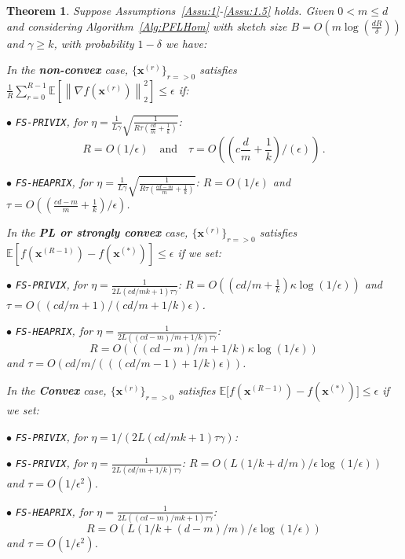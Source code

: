 \documentclass[sigconf, anonymous, review]{acmart}
\newtheorem{theorem}{Theorem}
\begin{document}
\begin{theorem}\label{thm:homog_case}
Suppose Assumptions~\ref{Assu:1}-\ref{Assu:1.5} holds. 
Given $0<m\leq d$ and considering Algorithm~\ref{Alg:PFLHom} with sketch size $B=O\left(m\log\left(\frac{d R}{\delta}\right)\right)$ and $\gamma\geq k$, with probability $1-\delta$ we have: 

In the \textbf{non-convex} case, $\{ {\boldsymbol{x}}^{(r)}\}_{r=>0}$ satisfies  $\frac{1}{R}\sum_{r=0}^{R-1}\mathbb{E}\left[\left\|\nabla f({\boldsymbol{x}}^{(r)})\right\|_2^2\right]\leq {\epsilon}$ if: 
 
\noindent $\bullet$ \texttt{FS-PRIVIX}, for $\eta=\frac{1}{L\gamma}\sqrt{\frac{1}{R\tau\left(\frac{c d}{m }+\frac{1}{k}\right)}}$: 
$$R=O\left(1/\epsilon\right) \quad \textrm{and} \quad  \tau=O\left(( c\frac{d}{m}+\frac{1}{k})/(\epsilon)\right) \, .$$

\noindent $\bullet$ \texttt{FS-HEAPRIX}, for $\eta=\frac{1}{L\gamma}\sqrt{\frac{1}{R\tau\left(\frac{cd-m}{m}+\frac{1}{k}\right)}}$: $R=O\left(1/\epsilon\right)$ and $\tau=O\left(( \frac{c d-m}{m}+\frac{1}{k})/\epsilon\right)$.

In the \textbf{PL or strongly convex} case, $\{ {\boldsymbol{x}}^{(r)}\}_{r=>0}$ satisfies $\mathbb{E}[f({\boldsymbol{x}}^{(R-1)})-f({\boldsymbol{x}}^{(*)})]\leq \epsilon$ if  we set:  

\noindent $\bullet$ \texttt{FS-PRIVIX}, for $\eta=\frac{1}{2L(cd/mk+1)\tau\gamma}$: $R=O\left(\left(c d/m+\frac{1}{k}\right)\kappa\log\left(1/\epsilon\right)\right)$ and $\tau=O\left((c d/m+1)\Big/\left(c d/m+1/k\right)\epsilon\right)$.

\noindent $\bullet$ \texttt{FS-HEAPRIX}, for $\eta=\frac{1}{2L\left((cd-m)/m+1/k\right)\tau\gamma}$: 
$$R = O\left(\left((cd-m)/m+1/k\right)\kappa\log\left(1/\epsilon\right)\right)$$ and $ \tau =O\left(cd/m\Big/\left(\left((cd/m-1)+1/k\right)\epsilon\right)\right)$.


In the \textbf{Convex} case, $\{ {\boldsymbol{x}}^{(r)}\}_{r=>0}$ satisfies $ \mathbb{E}\Big[f({\boldsymbol{x}}^{(R-1)})-f({\boldsymbol{x}}^{(*)})\Big]\leq \epsilon$ if we set:  

\noindent $\bullet$ \texttt{FS-PRIVIX}, for $\eta=1/(2L(cd/mk+1)\tau\gamma)$: 

\noindent $\bullet$ \texttt{FS-PRIVIX}, for $\eta=\frac{1}{2L(cd/m+1/k)\tau\gamma}$: $R =O\left(L\left(1/k+d/m\right)/\epsilon\log\left(1/\epsilon \right)\right)$ and $\tau=O\left(1/\epsilon^2\right)$.

\noindent $\bullet$ \texttt{FS-HEAPRIX}, for $\eta=\frac{1}{2L\left((cd-m)/mk+1\right)\tau\gamma}$:   
$$R =O\left(L\left(1/k+(d-m)/m\right)/\epsilon\log\left(1/\epsilon \right)\right)$$ and $\tau=O\left(1/\epsilon^2\right)$.


\end{theorem}
\end{document}
